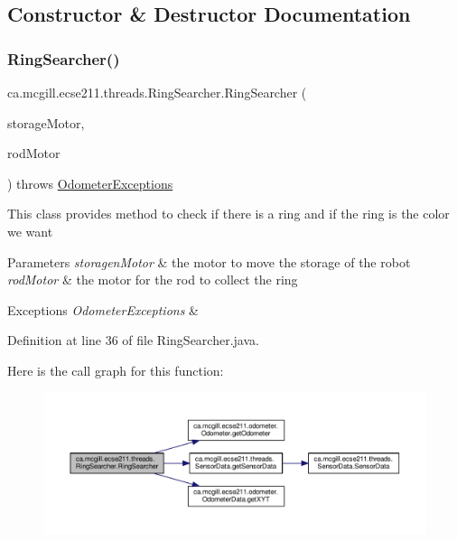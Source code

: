 \subsection{Constructor \& Destructor Documentation}
\mbox{\label{classca_1_1mcgill_1_1ecse211_1_1threads_1_1_ring_searcher_a58fdaba16c2b961446d1474b76e66e49}} 
\subsubsection{\texorpdfstring{Ring\+Searcher()}{RingSearcher()}}
{\footnotesize\ttfamily ca.\+mcgill.\+ecse211.\+threads.\+Ring\+Searcher.\+Ring\+Searcher (\begin{DoxyParamCaption}\item[{E\+V3\+Large\+Regulated\+Motor}]{storage\+Motor,  }\item[{E\+V3\+Medium\+Regulated\+Motor}]{rod\+Motor }\end{DoxyParamCaption}) throws \hyperlink{classca_1_1mcgill_1_1ecse211_1_1odometer_1_1_odometer_exceptions}{Odometer\+Exceptions}}

This class provides method to check if there is a ring and if the ring is the color we want


\begin{DoxyParams}{Parameters}
{\em storagen\+Motor} & the motor to move the storage of the robot \\
\hline
{\em rod\+Motor} & the motor for the rod to collect the ring \\
\hline
\end{DoxyParams}

\begin{DoxyExceptions}{Exceptions}
{\em Odometer\+Exceptions} & \\
\hline
\end{DoxyExceptions}


Definition at line 36 of file Ring\+Searcher.\+java.

Here is the call graph for this function\+:
\nopagebreak
\begin{figure}[H]
\begin{center}
\leavevmode
\includegraphics[width=350pt]{classca_1_1mcgill_1_1ecse211_1_1threads_1_1_ring_searcher_a58fdaba16c2b961446d1474b76e66e49_cgraph}
\end{center}
\end{figure}


